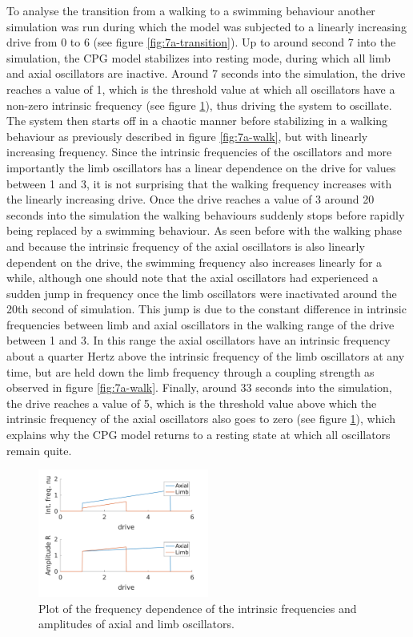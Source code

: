 \documentclass[a4paper]{scrartcl}
\begin{document}
{To analyse the transition from a walking to a swimming behaviour another simulation was run during which the model was subjected to a linearly increasing drive from 0 to 6 (see figure \ref{fig:7a-transition}). Up to around second 7 into the simulation, the CPG model stabilizes into resting mode, during which all limb and axial oscillators are inactive. Around 7 seconds into the simulation, the drive reaches a value of 1, which is the threshold value at which all oscillators have a non-zero intrinsic frequency (see figure \ref{fig:7a-saturation}), thus driving the system to oscillate. The system then starts off in a chaotic manner before stabilizing in a walking behaviour as previously described in figure \ref{fig:7a-walk}, but with linearly increasing frequency. Since the intrinsic frequencies of the oscillators and more importantly the limb oscillators has a linear dependence on the drive for values between 1 and 3, it is not surprising that the walking frequency increases with the linearly increasing drive. Once the drive reaches a value of 3 around 20 seconds into the simulation the walking behaviours suddenly stops before rapidly being replaced by a swimming behaviour. As seen before with the walking phase and because the intrinsic frequency of the axial oscillators is also linearly dependent on the drive, the swimming frequency also increases linearly for a while, although one should note that the axial oscillators had experienced a sudden jump in frequency once the limb oscillators were inactivated around the 20th second of simulation. This jump is due to the constant difference in intrinsic frequencies between limb and axial oscillators in the walking range of the drive between 1 and 3. In this range the axial oscillators have an intrinsic frequency about a quarter Hertz above the intrinsic frequency of the limb oscillators at any time, but are held down the limb frequency through a coupling strength as observed in figure \ref{fig:7a-walk}. Finally, around 33 seconds into the simulation, the drive reaches a value of 5, which is the threshold value above which the intrinsic frequency of the axial oscillators also goes to zero (see figure \ref{fig:7a-saturation}), which explains why the CPG model returns to a resting state at which all oscillators remain quite.

\begin{figure}[!h]
	\includegraphics[width=0.5\textwidth]{fig/figure7a-frequency-drive-dependence.png}
	\caption{Plot of the frequency dependence of the intrinsic frequencies and amplitudes of axial and limb oscillators.}
	\label{fig:7a-saturation}
\end{figure}


}
\end{document}
